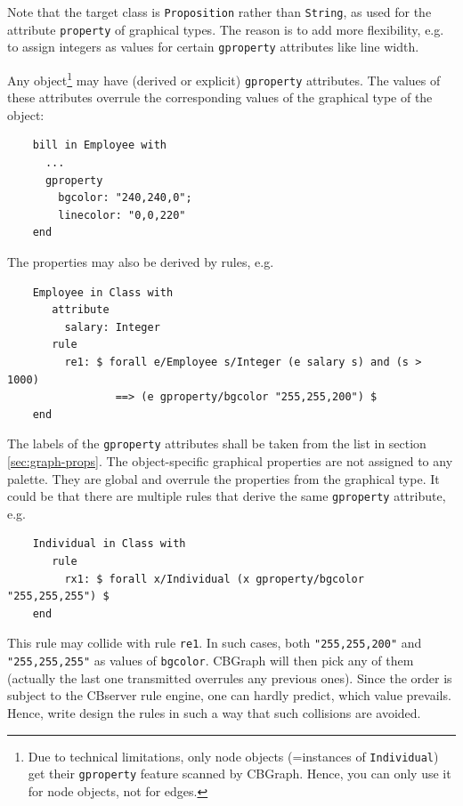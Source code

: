 Note that the target class is {\tt Proposition} rather than {\tt String}, as used for 
the attribute {\tt property} of graphical types. The reason is to add more flexibility,
e.g. to assign integers as values for certain {\tt gproperty} attributes like line width.


Any object\footnote{Due to technical limitations, only node objects (=instances of {\tt Individual}) get their {\tt gproperty} feature
scanned by CBGraph. Hence, you can only use it for node objects, not for edges.}%
may have (derived or explicit) {\tt gproperty} attributes. The values of these attributes 
overrule the corresponding values of the graphical type of the object:

{\small
\begin{verbatim}
    bill in Employee with
      ...
      gproperty
        bgcolor: "240,240,0";
        linecolor: "0,0,220"
    end
\end{verbatim}
}

The properties may also be derived by rules, e.g.\ 

{\small
\begin{verbatim}
    Employee in Class with
       attribute
         salary: Integer
       rule
         re1: $ forall e/Employee s/Integer (e salary s) and (s > 1000) 
                 ==> (e gproperty/bgcolor "255,255,200") $
    end
\end{verbatim}
}

The labels of the {\tt gproperty} attributes shall be taken from the list in section
\ref{sec:graph-props}.
The object-specific graphical properties are not assigned to any palette. They are global
and overrule the properties from the graphical type. It could be that there are multiple rules
that derive the same {\tt gproperty} attribute, e.g.

{\small
\begin{verbatim}
    Individual in Class with
       rule
         rx1: $ forall x/Individual (x gproperty/bgcolor "255,255,255") $
    end
\end{verbatim}
}

This rule may collide with rule {\tt re1}. In such cases, both {\tt "255,255,200"}
and {\tt "255,255,255"} as values of {\tt bgcolor}. CBGraph will then pick any of them
(actually the last one transmitted overrules any previous ones). Since the order is
subject to the CBserver rule engine, one can hardly predict, which value prevails.
Hence, write design the rules in such a way that such collisions are avoided.


